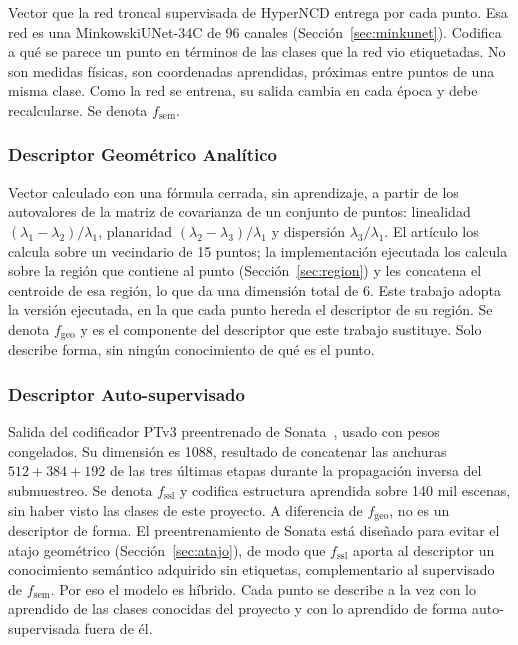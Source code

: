 Vector que la red troncal supervisada de HyperNCD entrega por cada punto. Esa
red es una MinkowskiUNet-34C de 96 canales (Sección~\ref{sec:minkunet}). Codifica a qué se parece un punto en términos
de las clases que la red vio etiquetadas. No son medidas físicas, son
coordenadas aprendidas, próximas entre puntos de una misma clase. Como la red se
entrena, su salida cambia en cada época y debe recalcularse. Se denota
$f_{\mathrm{sem}}$.

\subsubsection{Descriptor Geométrico Analítico}
\label{sec:fgeo}

Vector calculado con una fórmula cerrada, sin aprendizaje, a partir de los
autovalores  de la matriz de covarianza de
un conjunto de puntos: linealidad $(\lambda_1-\lambda_2)/\lambda_1$,
planaridad $(\lambda_2-\lambda_3)/\lambda_1$ y dispersión
$\lambda_3/\lambda_1$. El artículo los calcula sobre un vecindario de 15 puntos;
la implementación ejecutada los calcula sobre la región que contiene al punto
(Sección~\ref{sec:region}) y les concatena el centroide de esa región, lo que da
una dimensión total de 6. Este trabajo adopta la versión ejecutada, en la que cada punto
hereda el descriptor de su región. Se denota $f_{\mathrm{geo}}$ y es el
componente del descriptor que este trabajo sustituye. Solo describe forma, sin
ningún conocimiento de qué es el punto.

\subsubsection{Descriptor Auto-supervisado}
\label{sec:fssl}

Salida del codificador PTv3 preentrenado de Sonata~\cite{wu2025sonata}, usado
con pesos congelados.  Su dimensión es 1088, resultado de concatenar las anchuras
$512+384+192$ de las tres últimas etapas durante la propagación inversa del
submuestreo. Se denota $f_{\mathrm{ssl}}$ y codifica estructura aprendida sobre
140 mil escenas, sin haber visto las clases de este proyecto. A diferencia de
$f_{\mathrm{geo}}$, no es un descriptor de forma. El preentrenamiento de Sonata
está diseñado para evitar el atajo geométrico (Sección~\ref{sec:atajo}), de
modo que $f_{\mathrm{ssl}}$ aporta al descriptor un conocimiento semántico
adquirido sin etiquetas, complementario al supervisado de $f_{\mathrm{sem}}$.
Por eso el modelo es híbrido. Cada punto se describe a la vez
con lo aprendido de las clases conocidas del proyecto y con lo aprendido de
forma auto-supervisada fuera de él.

